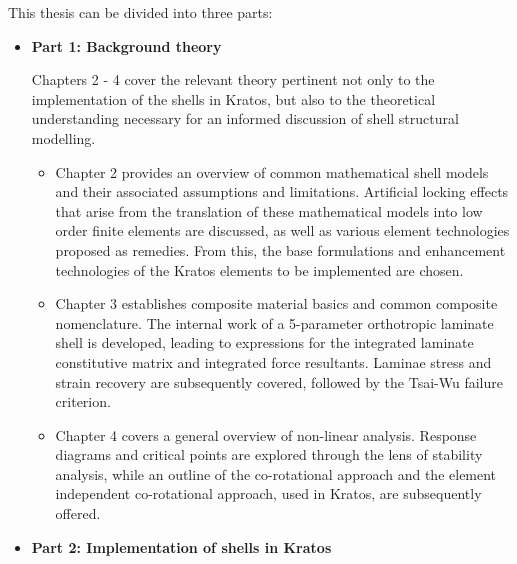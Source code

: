 \newpage
This thesis can be divided into three parts:
\begin{itemize}
	\item \textbf{Part 1: Background theory}
	
	Chapters 2 - 4 cover the relevant theory pertinent not only to the implementation of the shells in Kratos, but also to the theoretical understanding necessary for an informed discussion of shell structural modelling.
	\begin{itemize}
		\item Chapter 2 provides an overview of common mathematical shell models and their associated assumptions and limitations. Artificial locking effects that arise from the translation of these mathematical models into low order finite elements are discussed, as well as various element technologies proposed as remedies. From this, the base formulations and enhancement technologies of the Kratos elements to be implemented are chosen.
		\item Chapter 3 establishes composite material basics and common composite nomenclature. The internal work of a 5-parameter orthotropic laminate shell is developed, leading to expressions for the integrated laminate constitutive matrix and integrated force resultants. Laminae stress and strain recovery are subsequently covered, followed by the Tsai-Wu failure criterion.
		\item Chapter 4 covers a general overview of non-linear analysis. Response diagrams and critical points are explored through the lens of stability analysis, while an outline of the co-rotational approach and the element independent co-rotational approach, used in Kratos, are subsequently offered.
	\end{itemize}


	\item \textbf{Part 2: Implementation of shells in Kratos}
	

\end{itemize}
